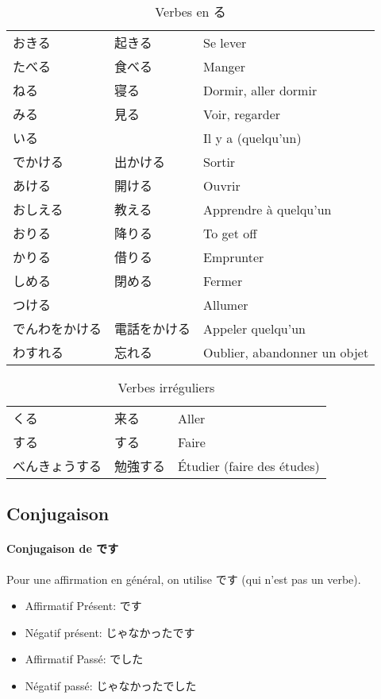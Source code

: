 \documentclass[a4paper,10pt,french,openany]{memoir}
\begin{document}
\begin{table}[h]
 \centering
 \begin{tabular}{lll}
  おきる & 起きる & Se lever \\
  たべる & 食べる & Manger \\
  ねる & 寝る & Dormir, aller dormir \\
  みる & 見る & Voir, regarder \\
  いる & & Il y a (quelqu'un) \\
  でかける & 出かける & Sortir \\
  あける & 開ける & Ouvrir \\
  おしえる & 教える & Apprendre à quelqu'un \\
  おりる & 降りる & To get off \\
  かりる & 借りる & Emprunter \\
  しめる & 閉める & Fermer \\
  つける & & Allumer \\
  でんわをかける & 電話をかける & Appeler quelqu'un \\
  わすれる & 忘れる & Oublier, abandonner un objet \\
 \end{tabular}
 \caption{Verbes en る}
 \label{tab:verbes-ru}
\end{table}

\begin{table}[h]
 \centering
 \begin{tabular}{lll}
  くる & 来る & Aller \\
  する & する & Faire \\
  べんきょうする & 勉強する & Étudier (faire des études) \\
 \end{tabular}
 \caption{Verbes irréguliers}
 \label{tab:verbes-irréguliers}
\end{table}

\subsection{Conjugaison}

\paragraph{Conjugaison de です}
Pour une affirmation en général, on utilise です (qui n'est pas un verbe).
\begin{itemize}
 \item Affirmatif Présent: です
 \item Négatif présent: じゃなかったです
 \item Affirmatif Passé: でした
 \item Négatif passé: じゃなかったでした
\end{itemize}
\end{document}
